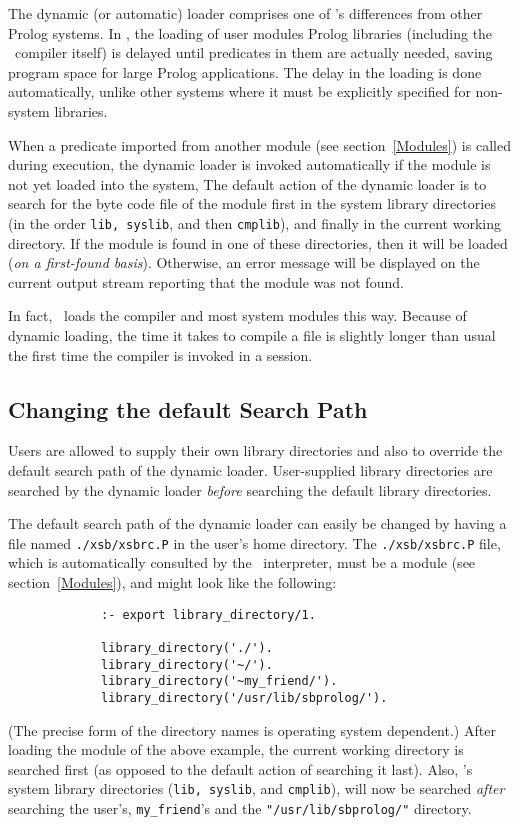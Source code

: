 The dynamic (or automatic) loader comprises one of \ourprolog's 
differences from other Prolog systems.
In \ourprolog, the loading of user modules Prolog libraries (including
the \ourprolog\ compiler itself) is delayed until predicates in them
are actually needed, saving program space for large Prolog
applications.  The delay in the loading is done automatically, unlike
other systems where it must be explicitly specified for non-system
libraries.

When a predicate imported from another module (see section~\ref{Modules})
is called during execution, the dynamic loader is invoked automatically
if the module is not yet loaded into the system, 
The default action of the dynamic loader is to search for the
byte code file of the module 
first in the system library directories (in the order {\tt lib, syslib}, 
and then {\tt cmplib}), and finally in the current working directory.
If the module is found in one of these directories, then it will 
be loaded ({\em on a first-found basis}). Otherwise, an error 
message will be displayed on the current output stream
reporting that the module was not found.

In fact, \ourprolog\ loads the compiler and most system modules this way.
Because of dynamic loading, the time it takes to compile a file 
is slightly longer than usual the first time the compiler is 
invoked in a session.


\subsection{Changing the default Search Path}
Users are allowed to supply their own library directories and also to
override the default search path of the dynamic loader. 
User-supplied library directories are searched by the dynamic loader 
{\em before} searching the default library directories.

The default search path of the dynamic loader can easily be changed
by having a file named {\verb|./xsb/xsbrc.P|} in the user's home directory.  
The {\verb|./xsb/xsbrc.P|} file, which is automatically consulted by the
 \ourprolog\ interpreter, must be a module (see section~\ref{Modules}),
and might look like the following:
\begin{verbatim}
             :- export library_directory/1.

             library_directory('./').
             library_directory('~/').
             library_directory('~my_friend/').
             library_directory('/usr/lib/sbprolog/').
\end{verbatim}
(The precise form of the directory names is operating system dependent.)
After loading the module of the above 
example, the current working directory is searched first (as opposed to the
default action of searching it last).  Also, \ourprolog's system
library directories ({\tt lib, syslib}, and {\tt cmplib}), will now
be searched {\em after} searching the user's, {\tt my\_friend}'s 
and the {\tt "/usr/lib/sbprolog/"} directory.

